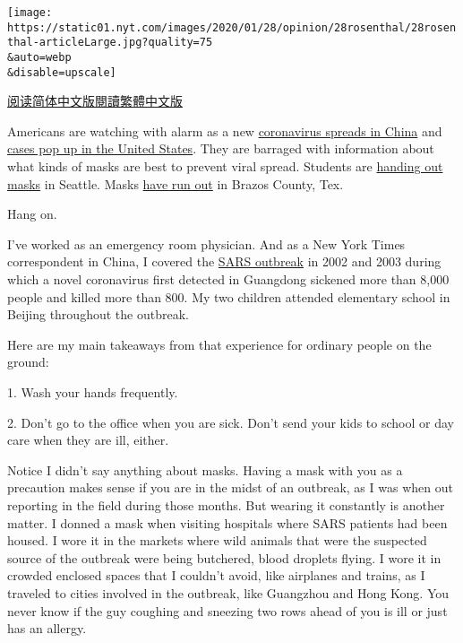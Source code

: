 \texttt{[image: https://static01.nyt.com/images/2020/01/28/opinion/28rosenthal/28rosenthal-articleLarge.jpg?quality=75\\\&auto=webp\\\&disable=upscale]}

\href{https://cn.nytimes.com/opinion/20200131/coronavirus-prevention-tips/}{阅读简体中文版}\href{https://cn.nytimes.com/opinion/20200131/coronavirus-prevention-tips/zh-hant/}{閱讀繁體中文版}

Americans are watching with alarm as a new
\href{https://www.nytimes.com/2020/01/29/business/china-coronavirus-economy.html}{coronavirus
spreads in China} and
\href{https://www.nytimes.com/interactive/2020/world/asia/china-wuhan-coronavirus-maps.html}{cases
pop up in the United States}. They are barraged with information about
what kinds of masks are best to prevent viral spread. Students are
\href{https://www.washingtonpost.com/world/coronavirus-china-live-updates/2020/01/25/0ca57a5e-3ed7-11ea-afe2-090eb37b60b1_story.html}{handing
out masks} in Seattle. Masks
\href{https://www.kbtx.com/content/news/Local-drug-stores-out-of-face-masks-after-potential-case-of-Coronavirus-detected-567279461.html}{have
run out} in Brazos County, Tex.

Hang on.

I've worked as an emergency room physician. And as a New York Times
correspondent in China, I covered the
\href{https://www.who.int/ith/diseases/sars/en/}{SARS outbreak} in 2002
and 2003 during which a novel coronavirus first detected in Guangdong
sickened more than 8,000 people and killed more than 800. My two
children attended elementary school in Beijing throughout the outbreak.

Here are my main takeaways from that experience for ordinary people on
the ground:

1. Wash your hands frequently.

2. Don't go to the office when you are sick. Don't send your kids to
school or day care when they are ill, either.

Notice I didn't say anything about masks. Having a mask with you as a
precaution makes sense if you are in the midst of an outbreak, as I was
when out reporting in the field during those months. But wearing it
constantly is another matter. I donned a mask when visiting hospitals
where SARS patients had been housed. I wore it in the markets where wild
animals that were the suspected source of the outbreak were being
butchered, blood droplets flying. I wore it in crowded enclosed spaces
that I couldn't avoid, like airplanes and trains, as I traveled to
cities involved in the outbreak, like Guangzhou and Hong Kong. You never
know if the guy coughing and sneezing two rows ahead of you is ill or
just has an allergy.

